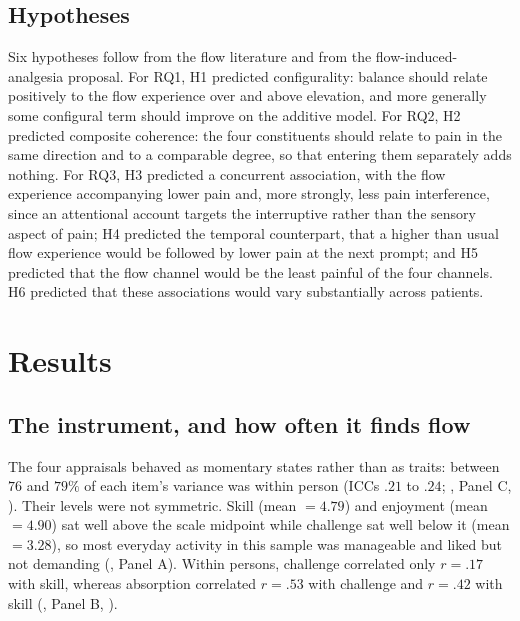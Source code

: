 \documentclass[11pt,a4paper]{article}
\begin{document}
\subsection{Hypotheses}
Six hypotheses follow from the flow literature and from the flow-induced-analgesia proposal. For
RQ1, H1 predicted configurality: balance should relate positively to the flow experience over and
above elevation, and more generally some configural term should improve on the additive model. For
RQ2, H2 predicted composite coherence: the four constituents should relate to pain in the same
direction and to a comparable degree, so that entering them separately adds nothing. For RQ3, H3
predicted a concurrent association, with the flow experience accompanying lower pain and, more
strongly, less pain interference, since an attentional account targets the interruptive rather than
the sensory aspect of pain; H4 predicted the temporal counterpart, that a higher than usual flow
experience would be followed by lower pain at the next prompt; and H5 predicted that the flow
channel would be the least painful of the four channels. H6 predicted that these associations would
vary substantially across patients.

\section{Results}

\subsection{The instrument, and how often it finds flow}
The four appraisals behaved as momentary states rather than as traits: between $76$ and $79\%$ of
each item's variance was within person (ICCs $.21$ to $.24$; , Panel C,
). Their levels were not symmetric. Skill (mean $=4.79$) and enjoyment
(mean $=4.90$) sat well above the scale midpoint while challenge sat well below it
(mean $=3.28$), so most everyday activity in this sample was manageable and liked but not
demanding (, Panel A). Within persons, challenge correlated only $r=.17$ with
skill, whereas absorption correlated $r=.53$ with challenge and $r=.42$ with skill
(, Panel B, ).
\end{document}
